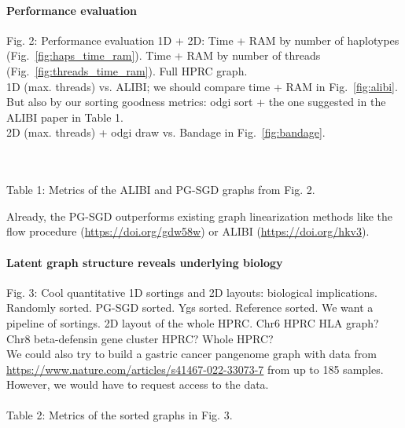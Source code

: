 \documentclass{bioinfo}
\theoremstyle{definition}
\begin{document}


\paragraph{Performance evaluation}
Fig. 2: Performance evaluation 1D + 2D: Time + RAM by number of haplotypes (Fig.~\ref{fig:haps_time_ram}). Time + RAM by number of threads (Fig.~\ref{fig:threads_time_ram}). Full HPRC graph.
\\
1D (max. threads) vs. ALIBI; we should compare time + RAM in Fig.~\ref{fig:alibi}.
But also by our sorting goodness metrics: odgi sort + the one suggested in the ALIBI paper in Table 1.
\\
2D (max. threads) + odgi draw vs. Bandage in Fig.~\ref{fig:bandage}.

\\
\\
Table 1: Metrics of the ALIBI and PG-SGD graphs from Fig. 2.

Already, the PG-SGD outperforms existing graph linearization methods like the flow procedure (\url{https://doi.org/gdw58w}) or ALIBI (\url{https://doi.org/hkv3}).
\paragraph{Latent graph structure reveals underlying biology}
Fig. 3: Cool quantitative 1D sortings and 2D layouts: biological implications.
Randomly sorted. PG-SGD sorted. Ygs sorted. Reference sorted.
We want a pipeline of sortings. 2D layout of the whole HPRC.
Chr6 HPRC HLA graph? Chr8 beta-defensin gene cluster HPRC? Whole HPRC?
\\
We could also try to build a gastric cancer pangenome graph with data from \url{https://www.nature.com/articles/s41467-022-33073-7} from up to 185 samples.
However, we would have to request access to the data.
\\
\\

Table 2: Metrics of the sorted graphs in Fig. 3.

\end{document}

